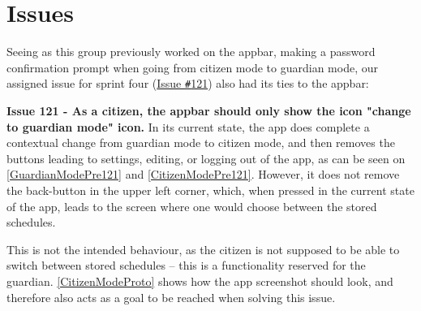 \section{Issues}\label{SEC:Sprint4Issues}
Seeing as this group previously worked on the appbar, making a password confirmation prompt when going from citizen mode to guardian mode, our assigned issue for sprint four (\href{https://github.com/aau-giraf/weekplanner/issues/121}{Issue \texttt{\#}121}) also had its ties to the appbar:

\textbf{Issue 121 - As a citizen, the appbar should only show the icon "change to guardian mode" icon.} In its current state, the app does complete a contextual change from guardian mode to citizen mode, and then removes the buttons leading to settings, editing, or logging out of the app, as can be seen on \autoref{GuardianModePre121} and \autoref{CitizenModePre121}.
However, it does not remove the back-button in the upper left corner, which, when pressed in the current state of the app, leads to the screen where one would choose between the stored schedules.


This is not the intended behaviour, as the citizen is not supposed to be able to switch between stored schedules -- this is a functionality reserved for the guardian.
\autoref{CitizenModeProto} shows how the app screenshot should look, and therefore also acts as a goal to be reached when solving this issue.

